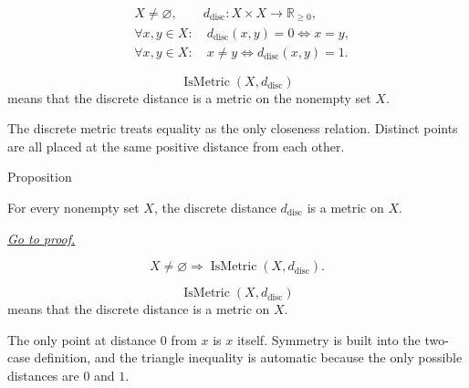 \begin{remark*}
\[
\begin{aligned}
&X\neq\varnothing,\qquad
d_{\mathrm{disc}}:X\times X\to\mathbb{R}_{\geq 0},\\
&\forall x,y\in X{:}\quad
d_{\mathrm{disc}}(x,y)=0 \Longleftrightarrow x=y,\\
&\forall x,y\in X{:}\quad
x\neq y \Longleftrightarrow d_{\mathrm{disc}}(x,y)=1.
\end{aligned}
\]
\end{remark*}

\begin{remark*}
\[
\operatorname{IsMetric}(X,d_{\mathrm{disc}})
\]
means that the discrete distance is a metric on the nonempty set \(X\).
\end{remark*}

\begin{remark*}[Interpretation]
The discrete metric treats equality as the only closeness relation.  Distinct
points are all placed at the same positive distance from each other.
\end{remark*}

\DefinitionalRoot

\begin{propositionbox}{Proposition}
\begin{proposition}
\label{prop:discrete-metric-space}
For every nonempty set \(X\), the discrete distance
\(d_{\mathrm{disc}}\) is a metric on \(X\).

\smallskip
\noindent
\hyperref[prf:discrete-metric-space]{\textit{Go to proof.}}
\end{proposition}
\end{propositionbox}

\begin{remark*}
\[
X\neq\varnothing
\Longrightarrow
\operatorname{IsMetric}(X,d_{\mathrm{disc}}).
\]
\end{remark*}

\begin{remark*}
\[
\operatorname{IsMetric}(X,d_{\mathrm{disc}})
\]
means that the discrete distance is a metric on \(X\).
\end{remark*}

\begin{remark*}[Interpretation]
The only point at distance \(0\) from \(x\) is \(x\) itself.  Symmetry is built
into the two-case definition, and the triangle inequality is automatic because
the only possible distances are \(0\) and \(1\).
\end{remark*}

